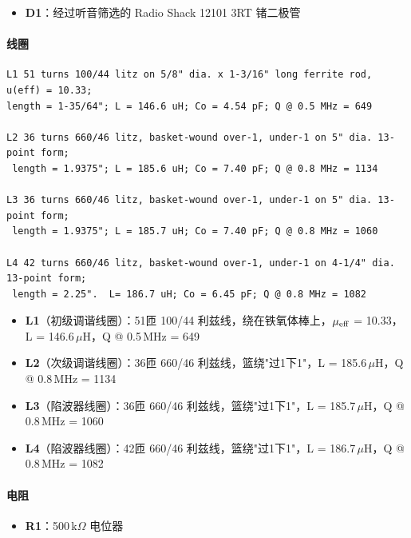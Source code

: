 \begin{itemize}[leftmargin=2cm]
    \item \textbf{D1}：经过听音筛选的 Radio Shack 12101 3RT 锗二极管
\end{itemize}

\paragraph{线圈}

\begin{verbatim}
L1 51 turns 100/44 litz on 5/8" dia. x 1-3/16" long ferrite rod, u(eff) = 10.33;
length = 1-35/64"; L = 146.6 uH; Co = 4.54 pF; Q @ 0.5 MHz = 649

L2 36 turns 660/46 litz, basket-wound over-1, under-1 on 5" dia. 13-point form;
 length = 1.9375"; L = 185.6 uH; Co = 7.40 pF; Q @ 0.8 MHz = 1134

L3 36 turns 660/46 litz, basket-wound over-1, under-1 on 5" dia. 13-point form;
 length = 1.9375"; L = 185.7 uH; Co = 7.40 pF; Q @ 0.8 MHz = 1060

L4 42 turns 660/46 litz, basket-wound over-1, under-1 on 4-1/4" dia. 13-point form;
 length = 2.25".  L= 186.7 uH; Co = 6.45 pF; Q @ 0.8 MHz = 1082
\end{verbatim}

\begin{itemize}[leftmargin=2cm]
    \item \textbf{L1}（初级调谐线圈）：51匝 100/44 利兹线，绕在铁氧体棒上，$\mu_{\rm eff}$ = 10.33，L = 146.6\,$\mu$H，Q @ 0.5\,MHz = 649
    \item \textbf{L2}（次级调谐线圈）：36匝 660/46 利兹线，篮绕"过1下1"，L = 185.6\,$\mu$H，Q @ 0.8\,MHz = 1134
    \item \textbf{L3}（陷波器线圈）：36匝 660/46 利兹线，篮绕"过1下1"，L = 185.7\,$\mu$H，Q @ 0.8\,MHz = 1060
    \item \textbf{L4}（陷波器线圈）：42匝 660/46 利兹线，篮绕"过1下1"，L = 186.7\,$\mu$H，Q @ 0.8\,MHz = 1082
\end{itemize}

\paragraph{电阻}

\begin{itemize}[leftmargin=2cm]
    \item \textbf{R1}：500\,k$\Omega$ 电位器
\end{itemize}

